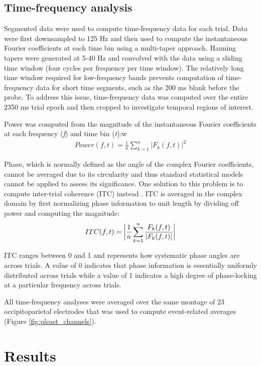 \documentclass[dwyatte_dissertation.tex]{subfiles}
\begin{document}
\subsection{Time-frequency analysis}
Segmented data were used to compute time-frequency data for each trial. Data were first downsampled to 125 Hz and then used to compute the instantaneous Fourier coefficients at each time bin using a multi-taper approach. Hanning tapers were generated at 5-40 Hz and convolved with the data using a sliding time window (four cycles per frequency per time window). The relatively long time window required for low-frequency bands prevents computation of time-frequency data for short time segments, such as the 200 ms blank before the probe. To address this issue, time-frequency data was computed over the entire 2350 ms trial epoch and then cropped to investigate temporal regions of interest.

Power was computed from the magnitude of the instantaneous Fourier coefficients at each frequency (\textit{f}) and time bin (\textit{t}):w
\begin{align*}
Power(f,t) = \frac{1}{n} \sum_{k=1}^{n}{|F_k(f,t)|}^2
\end{align*}

Phase, which is normally defined as the angle of the complex Fourier coefficients, cannot be averaged due to its circularity and thus standard statistical models cannot be applied to assess its significance. One solution to this problem is to compute inter-trial coherence (ITC) instead \cite{LachauxRodriguezMartinerieEtAl99}. ITC is averaged in the complex domain by first normalizing phase information to unit length by dividing off power and computing the magnitude:
\begin{align*}
ITC(f,t) = \bigg{|}\frac{1}{n} \sum_{k=1}^{n}{\frac{F_k(f,t)}{|F_k(f,t)|}}\bigg{|}
\end{align*}

ITC ranges between 0 and 1 and represents how systematic phase angles are across trials. A value of 0 indicates that phase information is essentially uniformly distributed across trials while a value of 1 indicates a high degree of phase-locking at a particular frequency across trials.

All time-frequency analyses were averaged over the same montage of 23 occipitoparietal electrodes that was used to compute event-related averages (Figure \ref{fig:pleast_channels}). 

\section{Results}
\end{document}
